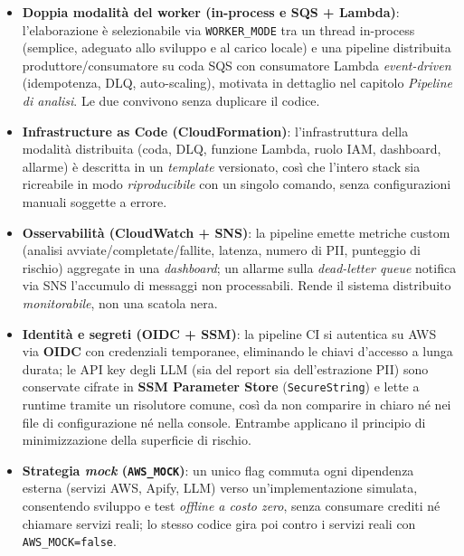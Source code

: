 \documentclass[11pt,a4paper]{article}
\begin{document}
\begin{itemize}[nosep]
        client\,$\leftrightarrow$\,proxy con un certificato \textbf{Let's Encrypt} per il
        dominio \texttt{social-privacy-detector.it}, emesso e rinnovato automaticamente da
        Certbot; l'identità del server è attestata da una CA riconosciuta, senza avvisi del
        browser.
  \item \textbf{Doppia modalità del worker (in-process e SQS + Lambda)}: l'elaborazione
        è selezionabile via \texttt{WORKER\_MODE} tra un thread in-process (semplice,
        adeguato allo sviluppo e al carico locale) e una pipeline distribuita
        produttore/consumatore su coda SQS con consumatore Lambda \emph{event-driven}
        (idempotenza, DLQ, auto-scaling), motivata in dettaglio nel capitolo
        \emph{Pipeline di analisi}. Le due convivono senza duplicare il codice.
  \item \textbf{Infrastructure as Code (CloudFormation)}: l'infrastruttura della
        modalità distribuita (coda, DLQ, funzione Lambda, ruolo IAM, dashboard, allarme)
        è descritta in un \emph{template} versionato, così che l'intero stack sia
        ricreabile in modo \emph{riproducibile} con un singolo comando, senza
        configurazioni manuali soggette a errore.
  \item \textbf{Osservabilità (CloudWatch + SNS)}: la pipeline emette metriche custom
        (analisi avviate/completate/fallite, latenza, numero di PII, punteggio di
        rischio) aggregate in una \emph{dashboard}; un allarme sulla \emph{dead-letter
        queue} notifica via SNS l'accumulo di messaggi non processabili. Rende il sistema
        distribuito \emph{monitorabile}, non una scatola nera.
  \item \textbf{Identità e segreti (OIDC + SSM)}: la pipeline CI si autentica su AWS via
        \textbf{OIDC} con credenziali temporanee, eliminando le chiavi d'accesso a lunga
        durata; le API key degli LLM (sia del report sia dell'estrazione PII) sono
        conservate cifrate in \textbf{SSM Parameter Store} (\texttt{SecureString}) e lette a
        runtime tramite un risolutore comune, così da non comparire in chiaro
        né nei file di configurazione né nella console. Entrambe applicano il principio di
        minimizzazione della superficie di rischio.
  \item \textbf{Strategia \emph{mock} (\texttt{AWS\_MOCK})}: un unico flag commuta ogni
        dipendenza esterna (servizi AWS, Apify, LLM) verso un'implementazione simulata,
        consentendo sviluppo e test \emph{offline a costo zero}, senza consumare crediti
        né chiamare servizi reali; lo stesso codice gira poi contro i servizi reali con
        \texttt{AWS\_MOCK=false}.
\end{itemize}
\end{document}
